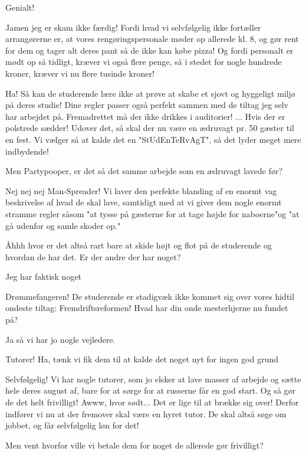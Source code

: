 \documentclass[a4paper,11pt]{article}
\begin{document}
\begin{sketch}
 Genialt!

 Jamen jeg er skam ikke færdig! Fordi hvad vi selvfølgelig ikke fortæller arrangørerne er, at vores rengøringspersonale møder op allerede kl. 8, og gør rent for dem og tager alt deres pant så de ikke kan købe pizza! Og fordi personalt er mødt op så tidligt, kræver vi også flere penge, så i stedet for nogle hundrede kroner, kræver vi nu flere tusinde kroner!

 Ha! Så kan de studerende lære ikke at prøve at skabe et sjovt og hyggeligt miljø på deres studie! Dine regler passer også perfekt sammen med de tiltag jeg selv har arbejdet på. Fremadrettet må der ikke drikkes i auditorier! ... Hvis der er polstrede sædder! Udover det, så skal der nu være en ædruvagt pr. 50 gæster til en fest. Vi vælger så at kalde det en  "StUdEnTeRvAgT", så det lyder meget mere indbydende!

 Men Partypooper, er det så det samme arbejde som en ædruvagt lavede før?

 Nej nej nej Man-Spreader! Vi laver den perfekte blanding af en enormt vag beskrivelse af hvad de skal lave, samtidigt med at vi giver dem nogle enormt stramme regler såsom "at tysse på gæsterne for at tage højde for naboerne"og "at gå udenfor og samle skoder op."


 Åhhh hvor er det altså rart bare at skide højt og flot på de studerende og hvordan de har det. Er der andre der har noget?

 Jeg har faktisk noget

 Drømmefangeren! De studerende er stadigvæk ikke kommet sig over vores hidtil ondeste tiltag: Fremdriftsreformen! Hvad har din onde mesterhjerne nu fundet på?

 Ja så vi har jo nogle vejledere.

 Tutorer! Ha, tænk vi fik dem til at kalde det noget nyt for ingen god grund

 Selvfølgelig! Vi har nogle tutorer, som jo elsker at lave masser af arbejde og sætte hele deres august af, bare for at sørge for at russerne får en god start. Og så gør de det helt frivilligt! Awww, hvor sødt... Det er lige til at brække sig over! Derfor indfører vi nu at der fremover skal være en hyret tutor. De skal altså søge om jobbet, og får selvfølgelig løn for det!

 Men vent hvorfor ville vi betale dem for noget de allerede gør frivilligt?


\end{sketch}
\end{document}

